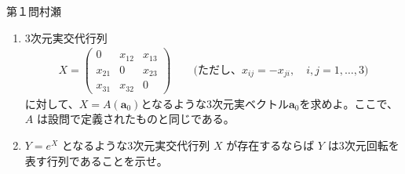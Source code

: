 \begin{question}{第１問}{村瀬}
\begin{enumerate}
\begin{enumerate}
\begin{align*}
      \Omega(\bm{n},\theta) = e^{\theta A(\bm{n})}
    \end{align*}
    であることを示せ。ここで、$A(\bm{a})$は、ある3次元実ベクトル$\bm{a}$に対して決まる
    3次元実正方行列であり、任意のベクトル$\bm{u}$に対して$A(\bm{a})\bm{u}=\bm{a}\times\bm{u}$を満たす
    ものとする。
  \item
    3次元実交代行列
    \begin{align*}
      X = \begin{pmatrix}
        0 & x_{12} & x_{13} \\
        x_{21} & 0 & x_{23} \\
        x_{31} & x_{32} & 0
      \end{pmatrix}\quad\quad\mbox{(ただし、$x_{ij}=-x_{ji},\quad i,j=1,\ldots,3$)}
    \end{align*}
    に対して、$X=A(\bm{a}_0)$となるような3次元実ベクトル$\bm{a}_0$を求めよ。ここで、$A$
    は設問で定義されたものと同じである。
  \item
    $Y=e^X$ となるような3次元実交代行列 $X$ が存在するならば $Y$ は3次元回転を
    表す行列であることを示せ。
  \end{enumerate}
\end{enumerate}
\end{question}

